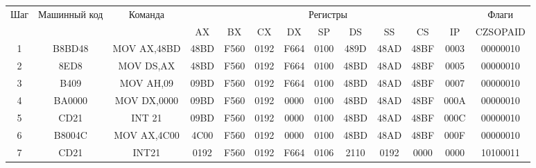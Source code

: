 \begin{tabular}{|c|c|c|c|c|c|c|c|c|c|c|c|c|}
\hline
	Шаг & Машинный код & Команда & \multicolumn{9}{|c|}{Регистры} & Флаги \\
	& & & AX & BX & CX & DX & SP & DS & SS & CS & IP & CZSOPAID \\
\hline
	1 & B8BD48 & MOV AX,48BD & 48BD & F560 & 0192 & F664 & 0100 & 489D & 48AD & 48BF & 0003 & 00000010 \\
\hline
	2 & 8ED8 & MOV DS,AX & 48BD & F560 & 0192 & F664 & 0100 & 48BD & 48AD  & 48BF & 0005 & 00000010 \\
\hline
	3 & B409 & MOV AH,09 & 09BD & F560 & 0192 & F664 & 0100 & 48BD & 48AD & 48BF & 0007 & 00000010 \\
\hline
	4 & BA0000 & MOV DX,0000 & 09BD & F560 & 0192 & 0000 & 0100 & 48BD & 48AD & 48BF & 000A & 00000010 \\
\hline 
	5 & CD21 & INT 21 & 09BD & F560 & 0192 & 0000 & 0100 & 48BD & 48AD & 48BF & 000C & 00000010 \\
\hline
	6 & B8004C & MOV AX,4C00 & 4C00 & F560 & 0192 & 0000 & 0100 & 48BD & 48AD & 48BF & 000F & 00000010 \\
\hline
	7 & CD21 & INT21 & 0192 & F560 & 0192 & F664 & 0106 & 2110 & 0192 & 0000 & 0000 & 10100011 \\
\hline
\end{tabular}
